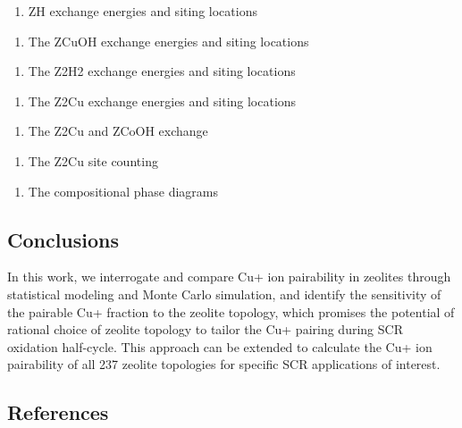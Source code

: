 \documentclass[12pt]{article}
\begin{document}
\begin{enumerate}[resume]
\item ZH exchange energies and siting locations
\end{enumerate}
\begin{enumerate}[resume]
\item The ZCuOH exchange energies and siting locations
\end{enumerate}
\begin{enumerate}[resume]
\item The Z2H2 exchange energies and siting locations
\end{enumerate}
\begin{enumerate}[resume]
\item The Z2Cu exchange energies and siting locations
\end{enumerate}
\begin{enumerate}[resume]
\item The Z2Cu and ZCoOH exchange
\end{enumerate}
\begin{enumerate}[resume]
\item The Z2Cu site counting
\end{enumerate}
\begin{enumerate}[resume]
\item The compositional phase diagrams
\end{enumerate}



\subsection*{Conclusions}

In this work, we interrogate and compare Cu+ ion pairability in zeolites through statistical modeling and Monte Carlo simulation, and identify the sensitivity of the pairable Cu+ fraction to the zeolite topology, which promises the potential of rational choice of zeolite topology to tailor the Cu+ pairing during SCR oxidation half-cycle. This approach can be extended to calculate the Cu+ ion pairability of all 237 zeolite topologies for specific SCR applications of interest. 

\subsection*{References}
\end{document}
